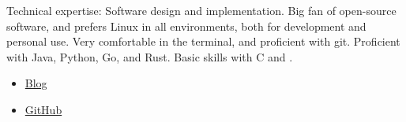 \documentclass[10pt]{article}
\begin{document}
\spacedhrule{0.5em}{-0.4em}


\inlineheadsection  %
  {Technical expertise:}
  {Software design and implementation. Big fan of open-source software, and prefers Linux in all environments, both for development and personal use. Very comfortable in the terminal, and proficient with git. Proficient with Java, Python, Go, and Rust. Basic skills with C and \CPP.}

\begin{itemize}
	\item{\href{http://dead10ck.github.io/}{Blog}}
	\item{\href{https://github.com/dead10ck}{GitHub}}
\end{itemize}
\end{document}
